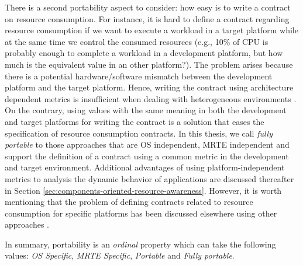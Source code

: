 \begin{itemize}
There is a second portability aspect to consider: how easy is to write a contract on resource consumption.
For instance, it is hard to define a contract regarding resource consumption if we want to execute a workload in a target platform while at the same time we control the consumed resources (e.g., 10\% of CPU is probably enough to complete a workload in a development platform, but how much is the equivalent value in an other platform?).
The problem arises because there is a potential hardware/software mismatch between the development platform and the target platform.
Hence, writing the contract using architecture dependent metrics is insufficient when dealing with heterogeneous environments \cite{Daly2001, Dufour:2003:DMJ:949343.949320}.
On the contrary, using values with the same meaning in both the development and target platforms for writing the contract is a solution that eases the specification of resource consumption contracts.
In this thesis, we call \textit{fully portable} to those approaches that are OS independent, MRTE independent and support the definition of a contract using a common metric in the development and target environment.
Additional advantages of using platform-independent metrics to analysis the dynamic behavior of applications are discussed thereafter in Section \ref{sec:components-oriented-resource-awareness}.
However, it is worth mentioning that the problem of defining contracts related to resource consumption for specific platforms has been discussed elsewhere using other approaches \cite{Lambert200897, Pathak:2012:ESI:2168836.2168841}.


In summary, portability is an \textit{ordinal} property which can take the following values: \textit{OS Specific}, \textit{MRTE Specific}, \textit{Portable} and  \textit{Fully portable}.


\end{itemize}
